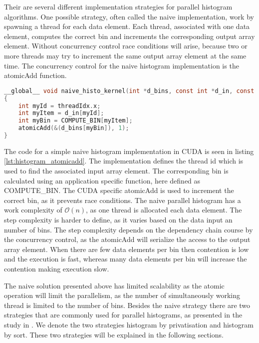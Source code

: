 Their are several different implementation strategies for parallel histogram algorithms. One possible strategy, often called the naive implementation, work by spawning a thread for each data element. Each thread, associated with one data element, computes the correct bin and increments the corresponding output array element. Without concurrency control race conditions will arise, because two or more threads may try to increment the same output array element at the same time. The concurrency control for the naive histogram implementation is the atomicAdd function.

\begin{lstlisting}[language=C,caption={Pseudo code for naive implementation of histogram using atomics},label=lst:histogram_atomicadd]
__global__ void naive_histo_kernel(int *d_bins, const int *d_in, const int BIN_COUNT)
{
	int myId = threadIdx.x;
	int myItem = d_in[myId];
	int myBin = COMPUTE_BIN[myItem];
	atomicAdd(&(d_bins[myBin]), 1);
}
\end{lstlisting}

The code for a simple naive histogram implementation in CUDA is seen in listing \ref{lst:histogram_atomicadd}. The implementation defines the thread id which is used to find the associated input array element. The corresponding bin is calculated using an application specific function, here defined as COMPUTE\_BIN. The CUDA specific atomicAdd is used to increment the correct bin, as it prevents race conditions. The naive parallel histogram has a work complexity of $\mathcal{O}(n)$, as one thread is allocated each data element. The step complexity is harder to define, as it varies based on the data input an number of bins. The step complexity depends on the dependency chain course by the concurrency control, as the atomicAdd will serialize the access to the output array element. When there are few data elements per bin then contention is low and the execution is fast, whereas many data elements per bin will increase the contention making execution slow. 

The naive solution presented above has limited scalability as the atomic operation will limit the parallelism, as the number of simultaneously working thread is limited to the number of bins. Besides the naive strategy there are two strategies that are commonly used for parallel histograms, as presented in the study in \cite{MilicHistogram}. We denote the two strategies histogram by privatisation and histogram by sort. These two strategies will be explained in the following sections.
